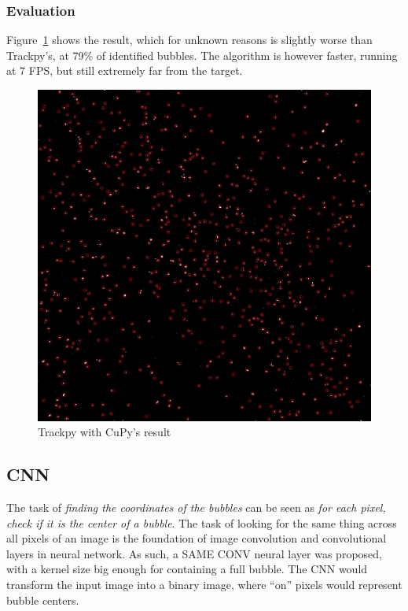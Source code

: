 \subsubsection{Evaluation}

Figure~\ref{fig:locate:trackpy-cupy} shows the result, which for unknown reasons is slightly worse than Trackpy's, at 79\% of identified bubbles.
The algorithm is however faster, running at 7 FPS, but still extremely far from the target.

\begin{figure}
	\centerline{\includegraphics[width=\locateimgsize]{images/locate/cuda-trackpy.png}}
	\caption{\centering Trackpy with CuPy's result}
	\label{fig:locate:trackpy-cupy}
\end{figure}

\subsection{CNN}

The task of \textit{finding the coordinates of the bubbles} can be seen as \textit{for each pixel, check if it is the center of a bubble}.
The task of looking for the same thing across all pixels of an image is the foundation of image convolution and convolutional layers in neural network.
As such, a SAME CONV neural layer was proposed, with a kernel size big enough for containing a full bubble.
The CNN would transform the input image into a binary image, where ``on'' pixels would represent bubble centers.


